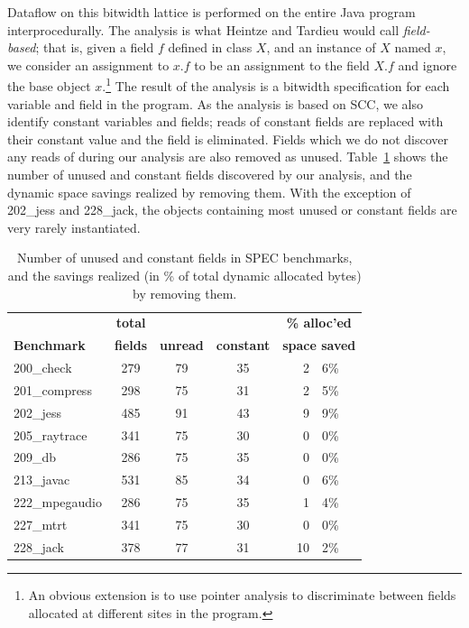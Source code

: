 \documentclass[preprint]{acmconf}
\begin{document}
Dataflow on this bitwidth lattice is performed on the entire Java
program interprocedurally.  The analysis is what Heintze and Tardieu
\cite{heintze01}
would call {\it field-based}; that is, given a field $f$ defined in
class $X$, and an instance of $X$ named $x$, we consider an assignment
to $x.f$ to be an assignment to the field $X.f$ and ignore the base
object $x$.\footnote{An obvious extension is to use pointer
analysis to discriminate between fields allocated at different sites
in the program.}  The result of the analysis is a bitwidth
specification for each variable and field in the program.  As the
analysis is based on SCC, we also identify constant variables and
fields; reads of constant fields are replaced with their constant
value and the field is eliminated.  Fields which we do not discover
any reads of during our analysis are also removed as unused.
Table~\ref{tab:const-unused} shows the number of unused and constant
fields discovered by our analysis, and the dynamic space savings
realized by removing them.  With the exception of 202\_jess and
228\_jack, the objects containing most unused or constant fields are
very rarely instantiated.
\begin{table}
\begin{tabular}{lcccr@{.}l}
&\bf total&&&\multicolumn{2}{c}{\bf\% alloc'ed}\\
\bf Benchmark &\bf fields &\bf unread &\bf constant &
\multicolumn{2}{c}{\bf space saved} \\\hline
200\_check	& 279 &   79   &   35   &  2&6\% \\
201\_compress	& 298 &   75   &   31   &  2&5\% \\
202\_jess	& 485 &   91   &   43   &  9&9\% \\
205\_raytrace	& 341 &   75   &   30   &  0&0\% \\
209\_db 	& 286 &   75   &   35   &  0&0\% \\
213\_javac	& 531 &   85   &   34   &  0&6\% \\
222\_mpegaudio	& 286 &   75   &   35   &  1&4\% \\
227\_mtrt	& 341 &   75   &   30   &  0&0\% \\
228\_jack	& 378 &   77   &   31   & 10&2\% \\
\end{tabular}
\caption{Number of unused and constant fields in SPEC benchmarks,
  and the savings realized (in \% of total dynamic allocated bytes) by
  removing them.}
\label{tab:const-unused}
\end{table}
\end{document}
